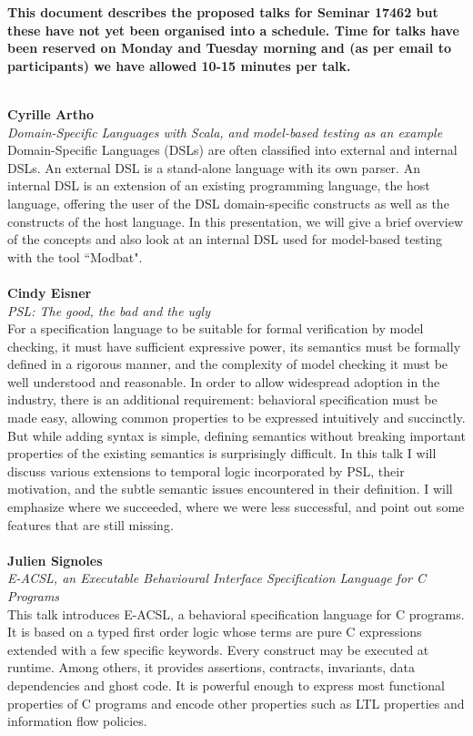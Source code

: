 \documentclass{article}
\newcommand{\talk}[3]{
\vspace{0.5em}~\\
\noindent
\textbf{#1}\\ 
\noindent\emph{#2}\\ 
\noindent#3\\
}
\begin{document}
\noindent
\textbf{\color{red}This document describes the proposed talks for Seminar 17462 but these have not yet been organised into a schedule. Time for talks have been reserved on Monday and Tuesday morning and (as per email to participants) we have allowed 10-15 minutes per talk.}

\talk{Cyrille Artho}{Domain-Specific Languages with Scala, and model-based testing as an example}
{Domain-Specific Languages (DSLs) are often classified into external and internal DSLs. An external DSL is a stand-alone language with its own parser. An internal DSL is an extension of an existing programming language, the host language, offering the user of the DSL domain-specific constructs as well as the constructs of the host language. In this presentation, we will give a brief overview of the concepts and also look at an internal DSL used for model-based testing with the tool ``Modbat".}
\talk{Cindy Eisner}{PSL: The good, the bad and the ugly}{For a specification language to be suitable for formal verification by model checking, it must have sufficient expressive power, its semantics must be formally defined in a rigorous manner, and the complexity of model checking it must be well understood and reasonable. In order to allow widespread adoption in the industry, there is an additional requirement: behavioral specification must be made easy, allowing common properties to be expressed intuitively and succinctly. But while adding syntax is simple, defining semantics without breaking important properties of the existing semantics is surprisingly difficult. In this talk I will discuss various extensions to temporal logic incorporated by PSL, their motivation, and the subtle semantic issues encountered in their definition. I will emphasize where we succeeded, where we were less successful, and point out some features that are still missing.}
\talk{Julien Signoles}{E-ACSL, an Executable Behavioural Interface Specification Language for C Programs}{This talk introduces E-ACSL, a behavioral specification language for C programs. It is based on a typed first order logic whose terms are pure C expressions extended with a few specific keywords. Every construct may be executed at runtime. Among others, it provides assertions, contracts, invariants, data dependencies and ghost code. It is powerful enough to express most functional properties of C programs and encode other properties such as LTL properties and information flow policies.}
\end{document}
